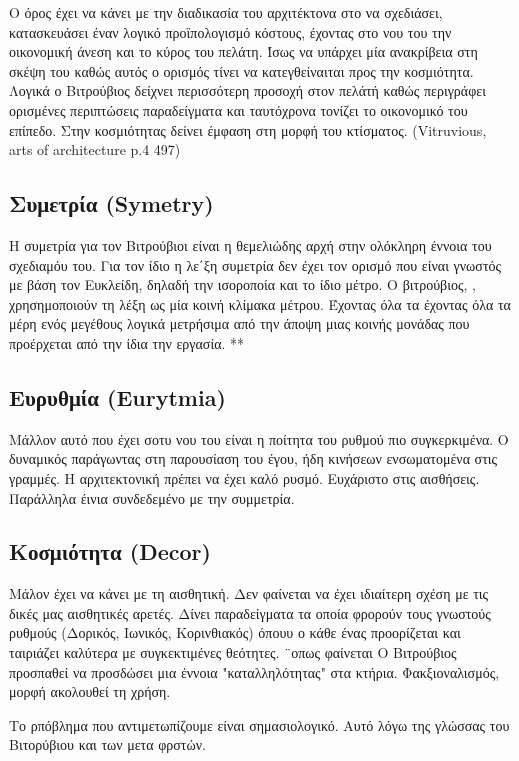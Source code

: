  Ο όρος έχει να κάνει με την διαδικασία του αρχιτέκτονα στο να σχεδιάσει, κατασκευάσει έναν λογικό προϊπολογισμό κόστους, έχοντας στο νου του την οικονομική άνεση και το κύρος του πελάτη. Ίσως να υπάρχει μία ανακρίβεια στη σκέψη του καθώς αυτός ο ορισμός τίνει να κατεγθείναιται προς την κοσμιότητα. Λογικά ο Βιτρούβιος δείχνει περισσότερη προσοχή στον πελάτή καθώς περιγράφει ορισμένες περιπτώσεις παραδείγματα και ταυτόχρονα τονίζει το οικονομικό του επίπεδο. Στην κοσμιότητας δείνει έμφαση στη μορφή του κτίσματος. (Vitruvious, arts of architecture p.4 497)
  
\subsection{Συμετρία (Symetry)}

  Η συμετρία για τον Βιτρούβιοι είναι η θεμελιώδης αρχή στην ολόκληρη έννοια του σχεδιαμόυ του. Για τον ίδιο η λε΄ξη συμετρία δεν έχει τον ορισμό που είναι γνωστός με βάση τον Ευκλείδη, δηλαδή την ισοροποία και το ίδιο μέτρο. Ο βιτρούβιος, , χρησημοποιούν τη λέξη ως μία κοινή κλίμακα μέτρου. Έχοντας όλα τα έχοντας όλα τα μέρη ενός μεγέθους λογικά μετρήσιμα από την άποψη μιας κοινής μονάδας που προέρχεται από την ίδια την εργασία. ** 
  
  \subsection{Ευρυθμία (Eurytmia)}
  
  Μάλλον αυτό που έχει σοτυ νου του είναι η ποίτητα του ρυθμού πιο συγκερκιμένα. Ο δυναμικός παράγωντας στη παρουσίαση του έγου, ήδη κινήσεων ενσωματομένα στις γραμμές. Η αρχιτεκτονική πρέπει να έχει καλό ρυσμό. Ευχάριστο στις αισθήσεις. Παράλληλα έινια συνδεδεμένο με την  συμμετρία.
  
  \subsection{Κοσμιότητα (Decor)}
  
  Μάλον έχει να κάνει με τη  αισθητική. Δεν φαίνεται να έχει ιδιαίτερη σχέση με τις δικές μας αισθητικές αρετές.
  Δίνει παραδείγματα τα οποία φρορούν τους γνωστούς ρυθμούς (Δορικός, Ιωνικός, Κορινθιακός) όπουυ ο κάθε ένας προορίζεται και ταιριάζει καλύτερα με συγκεκτιμένες θεότητες.
  ¨οπως φαίνεται Ο Βιτρούβιος προσπαθεί να προσδώσει μια έννοια "καταλληλότητας" στα κτήρια. Φακξιοναλισμός, μορφή ακολουθεί τη χρήση.
  
  Το ρπόβλημα που αντιμετωπίζουμε είναι σημασιολογικό. Αυτό λόγω της γλώσσας του Βιτορύβιου και των μετα φρστών. 